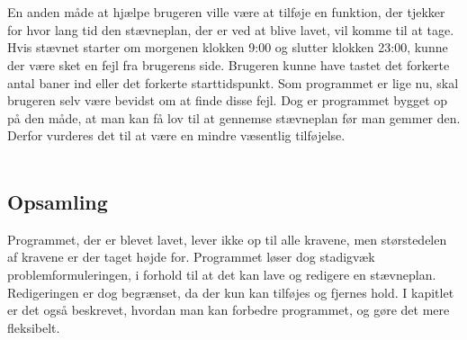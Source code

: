 \\\\
En anden måde at hjælpe brugeren ville være at tilføje en funktion, der tjekker for hvor lang tid den stævneplan, der er ved at blive lavet, vil komme til at tage. Hvis stævnet starter om morgenen klokken 9:00 og slutter klokken 23:00, kunne der være sket en fejl fra brugerens side. Brugeren kunne have tastet det forkerte antal baner ind eller det forkerte starttidspunkt. Som programmet er lige nu, skal brugeren selv være bevidst om at finde disse fejl. Dog er programmet bygget op på den måde, at man kan få lov til at gennemse stævneplan før man gemmer den. Derfor vurderes det til at være en mindre væsentlig tilføjelse.  
\\\\

\subsection*{Opsamling} 
Programmet, der er blevet lavet, lever ikke op til alle kravene, men størstedelen af kravene er der taget højde for. Programmet løser dog stadigvæk problemformuleringen, i forhold til at det kan lave og redigere en stævneplan. Redigeringen er dog begrænset, da der kun kan tilføjes og fjernes hold. I kapitlet er det også beskrevet, hvordan man kan forbedre programmet, og gøre det mere fleksibelt.